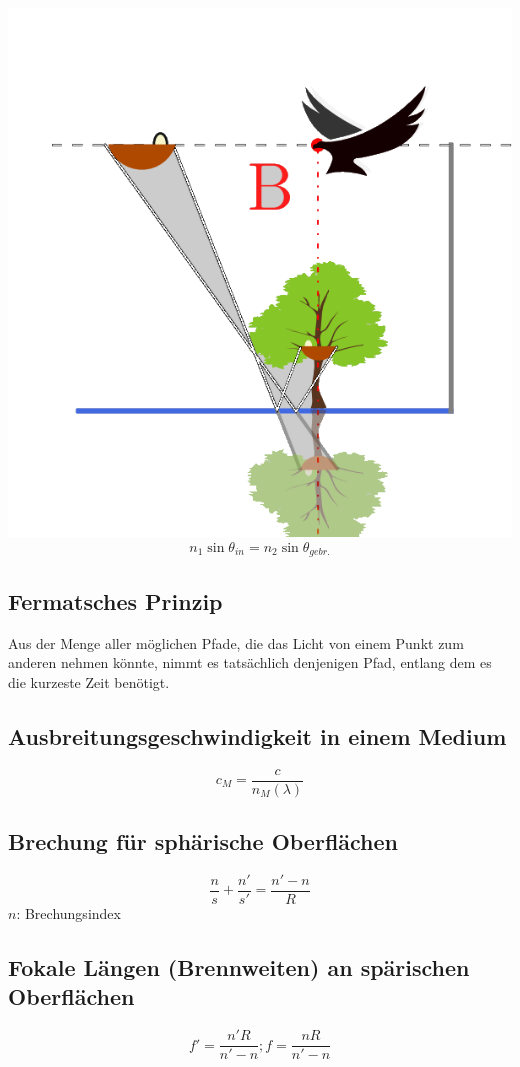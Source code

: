 \documentclass{article}
\begin{document}
\begin{multicols*}{3}
  \includegraphics[scale=0.15, angle=0]{voge}
  $$n_1\sin \theta _{in} = n_2\sin \theta _{gebr.}$$

  \subsection{Fermatsches Prinzip}
  Aus der Menge aller möglichen Pfade, die das Licht von einem Punkt zum anderen nehmen
  könnte, nimmt es tatsächlich denjenigen Pfad, entlang dem es die kurzeste Zeit benötigt.

  \subsection{Ausbreitungsgeschwindigkeit in einem Medium}
  $$c_M = \frac{c}{n_M(\lambda)}$$

  \subsection{Brechung für sphärische Oberflächen}
  $$\frac{n}{s}+\frac{n'}{s'}= \frac{n'-n}{R}$$
  $n$: Brechungsindex

  \subsection{Fokale Längen (Brennweiten) an spärischen Oberflächen}
  $$f'=\frac{n'R}{n'-n}; f = \frac{nR}{n'-n}$$

\end{multicols*}
\end{document}
